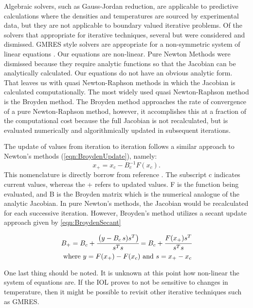 Algebraic solvers, such as Gauss-Jordan reduction, are applicable to predictive calculations where the densities and temperatures are sourced by experimental data, but they are not applicable to boundary valued iterative problems. 
Of the solvers that appropriate for iterative techniques, several but were considered and dismissed. \acf{GMRES} style solvers are appropriate for a non-symmetric system of linear equations \cite{Kelley1995}. Our equations are non-linear. Pure Newton Methods were dismissed because they require analytic functions so that the Jacobian can be analytically calculated. Our equations do not have an obvious analytic form. That leaves us with quasi Newton-Raphson methods in which the Jacobian is calculated computationally. The most widely used quasi Newton-Raphson method is the Broyden method. The Broyden method approaches the rate of convergence of a pure Newton-Raphson method, however, it accomplishes this at a fraction of the computational cost because the full Jacobian is not recalculated, but is evaluated numerically and algorithmically updated in subsequent iterations.

The update of values from iteration to iteration follows a similar approach to Newton's methods (\cref{eqn:BroydenUpdate}), namely:
%
\begin{equation}
	x_{+} = x_c - B_c^{-1} F(x_c).
	\label{eqn:BroydenUpdate}
\end{equation}
%
This nomenclature is directly borrow from reference \cite{Kelley1995}. The subscript c indicates current values, whereas the + refers to updated values. F is the function being evaluated, and B is the Broyden matrix which is the numerical analogue of the analytic Jacobian. In pure Newton's methods, the Jacobian would be recalculated for each successive iteration. However, Broyden's method utilizes a secant update approach given by \cref{eqn:BroydenSecant}

\begin{equation}  \label{eqn:BroydenSecant}
	\begin{split}
		B_{+} = B_c + \cfrac{\left(y - B_c \, s) s^T\right)}{s^T s} = B_c + \cfrac{F(x_{+})s^T}{s^Ts} \\
		\text{where } y = F(x_{+}) - F(x_c) \text{ and } s = x_{+} - x_c
	\end{split}
\end{equation}

One last thing should be noted. It is unknown at this point how non-linear the system of equations are. If the \ac{IOL} proves to not be sensitive to changes in temperature, then it might be possible to revisit other iterative techniques such as \ac{GMRES}.

